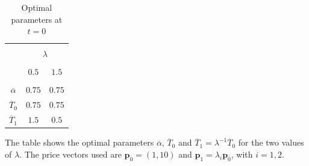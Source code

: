 \documentclass[english, a4paper, 12pt]{article}
\begin{document}
\vfill
\newpage
	\begin{table}[H]
		\centering
		\caption{Optimal parameters at $t = 0$}
		\label{tab:OptimalAlphaT}
		\begin{tabular}{ccc}
		\hline\hline
														\\[-2ex]
							&	\multicolumn{2}{c}{$\lambda$}	\\\cline{2-3}
														\\[-2ex]
							&	$0.5$		&	$1.5$	\\ \hline
														\\[-2ex]
			$\overline{\alpha}$	&	$0.75$		&	$0.75$	\\[1ex]
			$\overline{T}_{0}$	&	$0.75$		&	$0.75$	\\[1ex]
			$\overline{T}_{1}$	&	$1.5$		&	$0.5$	\\[.5ex]
		\hline\hline
		\end{tabular} \vspace{2ex}
		
		\begin{minipage}{0.3\textwidth} \scriptsize
			The table shows the optimal parameters $\overline{\alpha}$, $\overline{T}_{0}$ and $\overline{T}_{1} = \lambda^{-1} \overline{T}_{0}$ for the two values of $\lambda$. The price vectors used are $\mathbf{p}_{0} = (1,10)$ and $\mathbf{p}_{1} = \lambda_{i} \mathbf{p}_{0}$, with $i = 1,2$.
		\end{minipage}
	\end{table}
\end{document}
